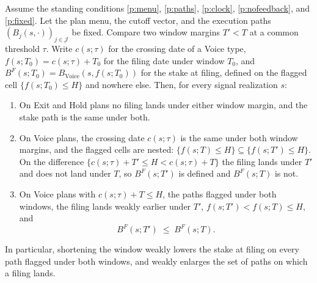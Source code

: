 \begin{lemma}
\label{lem:bf-monotone}
Assume the standing conditions \ref{p:menu}, \ref{p:paths}, \ref{p:clock}, \ref{p:nofeedback}, and \ref{p:fixed}. Let the plan menu, the cutoff vector, and the execution paths $(B_j(s, \cdot))_{j \in \mathcal J}$ be fixed. Compare two window margins $T' < T$ at a common threshold $\tau$. Write $c(s;\tau)$ for the crossing date of a Voice type, $f(s;T_0) = c(s;\tau) + T_0$ for the filing date under window $T_0$, and $B^F(s;T_0) = B_{\mathrm{Voice}}(s, f(s;T_0))$ for the stake at filing, defined on the flagged cell $\{f(s;T_0) \le H\}$ and nowhere else. Then, for every signal realization $s$:
\begin{enumerate}[label=(\alph*),leftmargin=2.4em,itemsep=3pt]
\item On Exit and Hold plans no filing lands under either window margin, and the stake path is the same under both.
\item On Voice plans, the crossing date $c(s;\tau)$ is the same under both window margins, and the flagged cells are nested: $\{f(s;T) \le H\} \subseteq \{f(s;T') \le H\}$. On the difference $\{c(s;\tau) + T' \le H < c(s;\tau) + T\}$ the filing lands under $T'$ and does not land under $T$, so $B^F(s;T')$ is defined and $B^F(s;T)$ is not.
\item On Voice plans with $c(s;\tau) + T \le H$, the paths flagged under both windows, the filing lands weakly earlier under $T'$, $f(s;T') < f(s;T) \le H$, and
\begin{equation}
\label{eq:bf-monotone}
B^F(s; T') \;\le\; B^F(s; T).
\end{equation}
\end{enumerate}
In particular, shortening the window weakly lowers the stake at filing on every path flagged under both windows, and weakly enlarges the set of paths on which a filing lands.
\end{lemma}

